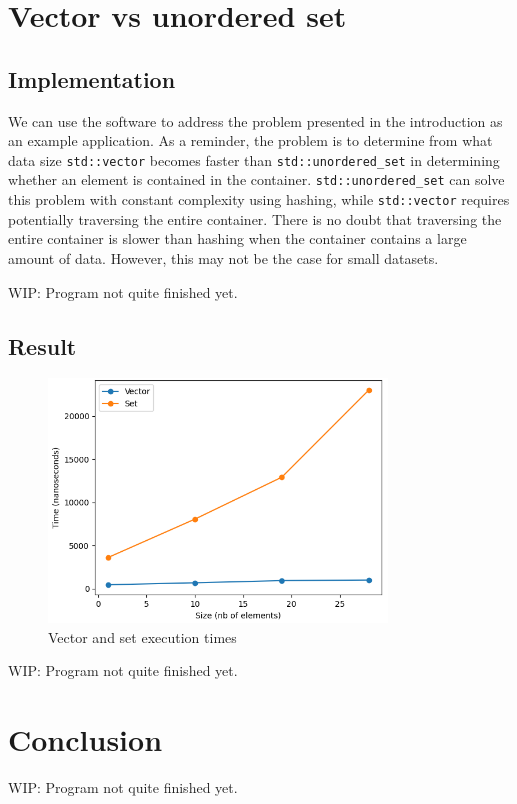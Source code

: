 \documentclass[conference]{IEEEtran}
\def\code#1{\texttt{#1}}
\begin{document}
\section{Vector vs unordered set}

\subsection{Implementation}

We can use the software to address the problem presented in the introduction as an example application. As a reminder, the problem is to determine from what data size \code{std::vector} becomes faster than \code{std::unordered\_set} in determining whether an element is contained in the container. \code{std::unordered\_set} can solve this problem with constant complexity using hashing, while \code{std::vector} requires potentially traversing the entire container. There is no doubt that traversing the entire container is slower than hashing when the container contains a large amount of data. However, this may not be the case for small datasets.

WIP: Program not quite finished yet.

\subsection{Result}



\begin{figure}[!h]
	\includegraphics[width=9cm]{Diagram/vector_vs_set.png}
	\caption{Vector and set execution times}
	\label{vector vs set}
\end{figure}

WIP: Program not quite finished yet.

\section{Conclusion}

WIP: Program not quite finished yet.



\end{document}
